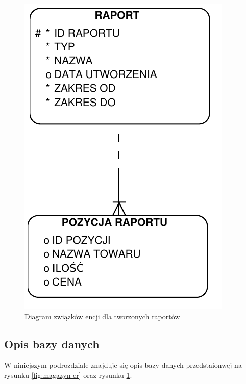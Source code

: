 \begin{figure}[!htb]
  \begin{center}
    \includegraphics[scale=0.7]{../img/model/diagram_er_raporty.pdf}
  \end{center}
  \caption{Diagram związków encji dla tworzonych raportów}
  \label{fig:raport-er}
\end{figure}
\FloatBarrier

\subsection{Opis bazy danych}
W niniejszym podrozdziale znajduje się opis bazy danych przedstaionwej na
rysunku \ref{fig:magazyn-er} oraz rysunku \ref{fig:raport-er}.

